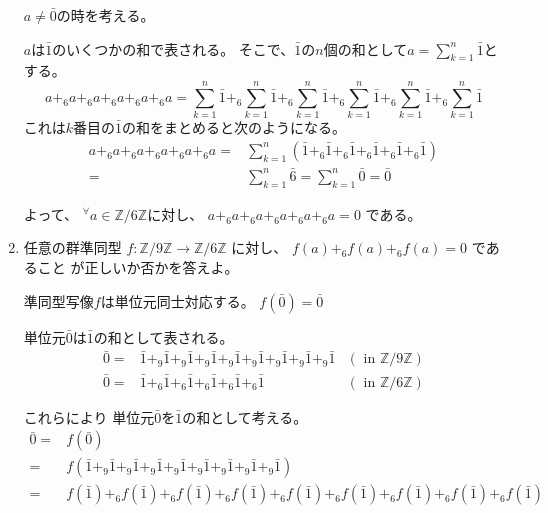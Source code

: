 \documentclass[12pt,b5paper]{ltjsarticle}
\begin{document}
\begin{enumerate}
      $a\ne\bar{0}$の時を考える。
      
      $a$は$\bar{1}$のいくつかの和で表される。
      そこで、$\bar{1}$の$n$個の和として$a=\sum_{k=1}^{n}\bar{1}$とする。
      \begin{equation}
       a +_{6} a +_{6} a +_{6} a +_{6} a +_{6} a
        =
       \sum_{k=1}^{n}\bar{1} +_{6} \sum_{k=1}^{n}\bar{1} +_{6}
       \sum_{k=1}^{n}\bar{1} +_{6} \sum_{k=1}^{n}\bar{1} +_{6}
       \sum_{k=1}^{n}\bar{1} +_{6} \sum_{k=1}^{n}\bar{1}
      \end{equation}
      これは$k$番目の$\bar{1}$の和をまとめると次のようになる。
      \begin{align}
       a +_{6} a +_{6} a +_{6} a +_{6} a +_{6} a
        =&
       \sum_{k=1}^{n}( \bar{1} +_{6} \bar{1} +_{6}
       \bar{1} +_{6} \bar{1} +_{6} \bar{1} +_{6} \bar{1})\\
        =& \sum_{k=1}^{n} \bar{6}
        = \sum_{k=1}^{n} \bar{0}
        = \bar{0}
      \end{align}

      よって、
      ${}^{\forall} a\in\mathbb{Z}/6\mathbb{Z}$に対し、
      $a +_{6} a +_{6} a +_{6} a +_{6} a +_{6} a =0$
      である。

\hrulefill
 \item
      任意の群準同型
      $f:\mathbb{Z}/9\mathbb{Z}\to\mathbb{Z}/6\mathbb{Z}$
      に対し、
      $f(a) +_{6} f(a) +_{6} f(a) =0$
      であること
      が正しいか否かを答えよ。

\dotfill


      準同型写像$f$は単位元同士対応する。
      $f(\bar{0})=\bar{0}$

      単位元$\bar{0}$は$\bar{1}$の和として表される。
      \begin{align}
       \bar{0}=& \bar{1}+_{9}\bar{1}+_{9}\bar{1}+_{9}\bar{1}
       +_{9}\bar{1}+_{9}\bar{1}+_{9}\bar{1}+_{9}\bar{1}+_{9}\bar{1}
       & (\text{ in } \mathbb{Z}/9\mathbb{Z})\\
       \bar{0}=& \bar{1}+_{6}\bar{1}+_{6}\bar{1}+_{6}\bar{1}
       +_{6}\bar{1}+_{6}\bar{1}
       & (\text{ in } \mathbb{Z}/6\mathbb{Z})
      \end{align}

      これらにより
      単位元$\bar{0}$を$\bar{1}$の和として考える。
      \begin{align}
       \bar{0} =& f(\bar{0})\\
       =& f(\bar{1}+_{9}\bar{1}+_{9}\bar{1}+_{9}\bar{1}
       +_{9}\bar{1}+_{9}\bar{1}+_{9}\bar{1}+_{9}\bar{1}+_{9}\bar{1})\\
       =& f(\bar{1}) +_{6} f(\bar{1}) +_{6} f(\bar{1})+_{6}
       f(\bar{1}) +_{6} f(\bar{1}) +_{6} f(\bar{1}) +_{6}
       f(\bar{1}) +_{6} f(\bar{1}) +_{6} f(\bar{1})
      \end{align}


\end{enumerate}
\end{document}
